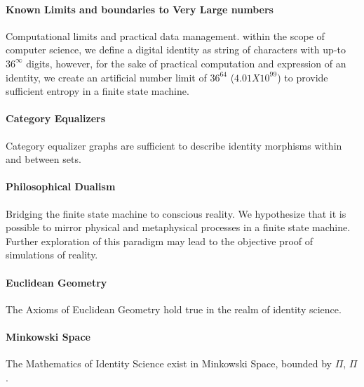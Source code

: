 \documentclass{article}
\begin{document}
		\paragraph{Known Limits and boundaries to Very Large numbers} Computational limits and practical data management.  within the scope of computer science, we define a digital identity as string of characters with up-to $36^\infty$ digits, however, for the sake of practical computation and expression of an identity, we create an artificial number limit of $36^{64}$ ($4.01 X10^{99}$) to provide sufficient entropy in a finite state machine.   
		\paragraph{Category Equalizers} Category equalizer graphs are sufficient to describe identity morphisms within and between sets.
		\paragraph{Philosophical Dualism} Bridging the finite state machine to conscious reality.  We hypothesize that it is possible to mirror physical and metaphysical processes in a finite state machine.  Further exploration of this paradigm may lead to the objective proof of simulations of reality.
		\paragraph{Euclidean Geometry} The Axioms of Euclidean Geometry hold true in the realm of identity science.
		\paragraph{Minkowski Space} The Mathematics of Identity Science exist in Minkowski Space, bounded by $\Pi$, $\Pi$.
\end{document}

